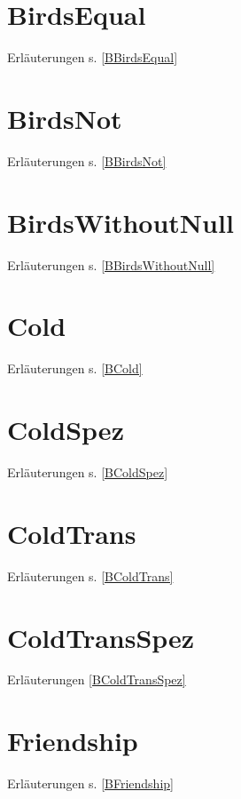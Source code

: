 \documentclass[a4paper, 11pt]{book}
\begin{document}
{\section{BirdsEqual} Erläuterungen s. \ref{BBirdsEqual}
\label{BirdsEqual}

\newpage

\section{BirdsNot} Erläuterungen s. \ref{BBirdsNot}
\label{BirdsNot}

\newpage

\section{BirdsWithoutNull} Erläuterungen s. \ref{BBirdsWithoutNull}
\label{BirdsWihoutNull}

\newpage

\section{Cold} Erläuterungen s. \ref{BCold}
\label{Cold}

\newpage


	\section{ColdSpez} Erläuterungen s. \ref{BColdSpez}
	\label{ColdSpez}
	

\newpage


\section{ColdTrans} Erläuterungen s.  \ref{BColdTrans}
\label{ColdTrans}


\newpage

	\section{ColdTransSpez} Erläuterungen \ref{BColdTransSpez}
	\label{ColdTransSpez}
	

\newpage


\section{Friendship} Erläuterungen s. \ref{BFriendship}
\label{Friendship}

\newpage

}
\end{document}
